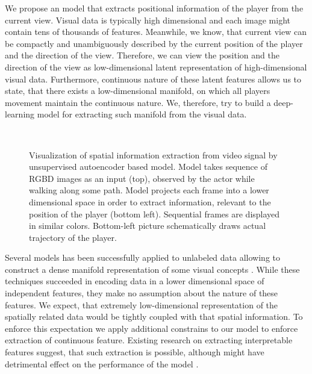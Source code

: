 We propose an model that extracts positional information of the player from the current view.
Visual data is typically high dimensional and each image might contain tens of thousands of features. Meanwhile, we know, that current view can be compactly and unambiguously described by the current position of the player and the direction of the view. Therefore, we can view the position and the direction of the view as low-dimensional latent representation of high-dimensional visual data. Furthermore, continuous nature of these latent features allows us to state, that there exists a low-dimensional manifold, on which all players movement maintain the continuous nature. We, therefore, try to build a deep-learning model for extracting such manifold from the visual data.

\begin{figure}[t!]
	\centering
	\\
    	\caption{Visualization of spatial information extraction from video signal by unsupervised autoencoder based model. Model takes sequence of RGBD images as an input (top), observed by the actor while walking along some path. Model projects each frame into a lower dimensional space in order to extract information, relevant to the position of the player (bottom left). Sequential frames are displayed in similar colors. Bottom-left picture schematically draws actual trajectory of the player.}
    	\label{fig:model_reco}
\end{figure}

Several models has been successfully applied to unlabeled data allowing to construct a dense manifold representation of some visual concepts \cite{Li2015, Kingma2013, Goodfellow2014}.
While these techniques succeeded in encoding data in a lower dimensional space of independent features, they make no assumption about the nature of these features.
We expect, that extremely low-dimensional representation of the spatially related data  would be tightly coupled with that spatial information.
To enforce this expectation we apply additional constrains to our model to enforce extraction of continuous feature.
Existing research on extracting interpretable features suggest, that such extraction is possible, although might have detrimental effect on the performance of the model \cite{Lei2016, Kulkarni2015}.

